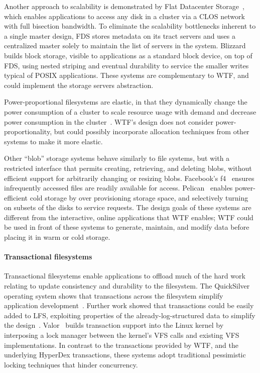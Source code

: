 \documentclass[twocolumn,10pt,letterpaper]{article}
\newcommand{\myparagraph}[1]{\vspace{-.25\baselineskip}\paragraph{#1}}
\begin{document}
Another approach to scalability is demonstrated by Flat Datacenter
Storage~\cite{fds}, which enables applications to access any disk in a cluster
via a CLOS network with full bisection bandwidth.  To eliminate the scalability
bottlenecks inherent to a single master design, FDS stores metadata on its tract
servers and uses a centralized master solely to maintain the list of servers in
the system.  Blizzard~\cite{blizzard} builds block storage, visible to
applications as a standard block device, on top of FDS, using nested striping
and eventual durability to service the smaller writes typical of POSIX
applications.  These systems are complementary to WTF, and could implement the
storage servers abstraction.

Power-proportional filesystems are elastic, in that they dynamically change the
power consumption of a cluster to scale resource usage with demand and decrease
power consumption in the cluster~\cite{rabbit,sierra,springfs}.  WTF's design
does not consider power-proportionality, but could possibly incorporate
allocation techniques from other systems to make it more elastic.

Other ``blob'' storage systems behave similarly to file systems, but with a
restricted interface that permits creating, retrieving, and deleting blobs,
without efficient support for arbitrarily changing or resizing blobs.
Facebook's f4~\cite{f4} ensures infrequently accessed files are readily
available for access.  Pelican~\cite{pelican} enables power-efficient cold
storage by over provisioning storage space, and selectively turning on subsets
of the disks to service requests.  The design goals of these systems are
different from the interactive, online applications that WTF enables; WTF could
be used in front of these systems to generate, maintain, and modify data before
placing it in warm or cold storage.

\myparagraph{Transactional filesystems}

Transactional filesystems enable applications to offload much of the hard work
relating to update consistency and durability to the filesystem.  The
QuickSilver operating system shows that transactions across the filesystem
simplify application development~\cite{quicksilver}.  Further work showed that
transactions could be easily added to LFS, exploiting properties of the
already-log-structured data to simplify the design~\cite{xactlfs}.
Valor~\cite{valor} builds transaction support into the Linux kernel by
interposing a lock manager between the kernel's VFS calls and existing VFS
implementations.  In contrast to the transactions provided by WTF, and the
underlying HyperDex transactions, these systems adopt traditional pessimistic
locking techniques that hinder concurrency.
\end{document}
